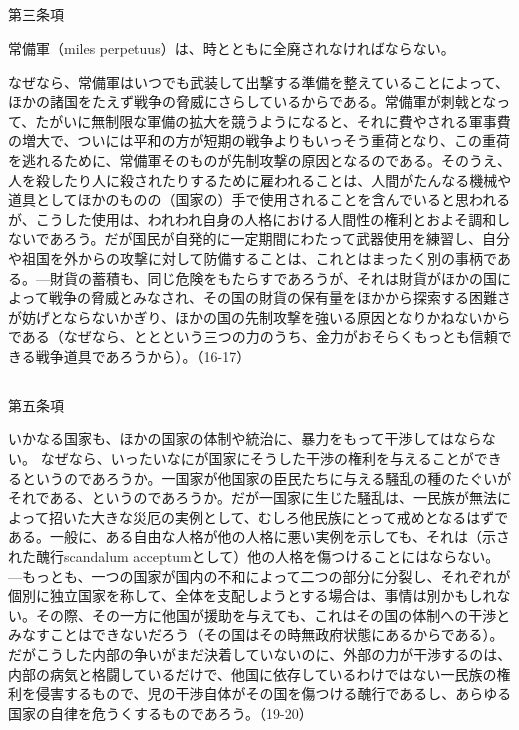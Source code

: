 \subsection{}


第三条項

常備軍（miles perpetuus）は、時とともに全廃されなければならない。

なぜなら、常備軍はいつでも武装して出撃する準備を整えていることによって、ほかの諸国をたえず戦争の脅威にさらしているからである。常備軍が刺戟となって、たがいに無制限な軍備の拡大を競うようになると、それに費やされる軍事費の増大で、ついには平和の方が短期の戦争よりもいっそう重荷となり、この重荷を逃れるために、常備軍そのものが先制攻撃の原因となるのである。そのうえ、人を殺したり人に殺されたりするために雇われることは、人間がたんなる機械や道具としてほかのものの（国家の）手で使用されることを含んでいると思われるが、こうした使用は、われわれ自身の人格における人間性の権利とおよそ調和しないであろう。だが国民が自発的に一定期間にわたって武器使用を練習し、自分や祖国を外からの攻撃に対して防備することは、これとはまったく別の事柄である。{\——}財貨の蓄積も、同じ危険をもたらすであろうが、それは財貨がほかの国によって戦争の脅威とみなされ、その国の財貨の保有量をほかから探索する困難さが妨げとならないかぎり、ほかの国の先制攻撃を強いる原因となりかねないからである（なぜなら、ととという三つの力のうち、金力がおそらくもっとも信頼できる戦争道具であろうから）。（16-17）


\subsection{}


第五条項

いかなる国家も、ほかの国家の体制や統治に、暴力をもって干渉してはならない。
なぜなら、いったいなにが国家にそうした干渉の権利を与えることができるというのであろうか。一国家が他国家の臣民たちに与える騒乱の種のたぐいがそれである、というのであろうか。だが一国家に生じた騒乱は、一民族が無法によって招いた大きな災厄の実例として、むしろ他民族にとって戒めとなるはずである。一般に、ある自由な人格が他の人格に悪い実例を示しても、それは（示された醜行scandalum acceptumとして）他の人格を傷つけることにはならない。{\——}もっとも、一つの国家が国内の不和によって二つの部分に分裂し、それぞれが個別に独立国家を称して、全体を支配しようとする場合は、事情は別かもしれない。その際、その一方に他国が援助を与えても、これはその国の体制への干渉とみなすことはできないだろう（その国はその時無政府状態にあるからである）。だがこうした内部の争いがまだ決着していないのに、外部の力が干渉するのは、内部の病気と格闘しているだけで、他国に依存しているわけではない一民族の権利を侵害するもので、児の干渉自体がその国を傷つける醜行であるし、あらゆる国家の自律を危うくするものであろう。（19-20）

